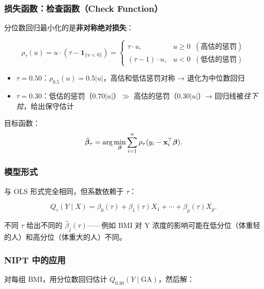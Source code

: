\subsubsection{损失函数：检查函数（Check Function）}

分位数回归最小化的是\textbf{非对称绝对损失}：

\begin{equation}
    \rho_\tau(u) = u \cdot (\tau - \mathbf{1}_{\{u < 0\}})
    = \begin{cases}
        \tau \cdot u,      & u \ge 0 \;\;(\text{高估的惩罚}) \\
        (\tau - 1) \cdot u, & u < 0 \;\;(\text{低估的惩罚})
    \end{cases}
\end{equation}

\begin{itemize}
    \item $\tau = 0.50$：$\rho_{0.5}(u) = 0.5|u|$，高估和低估惩罚对称 → 退化为中位数回归
    \item $\tau = 0.30$：低估的惩罚（$0.70|u|$）$\gg$ 高估的惩罚（$0.30|u|$）→ 回归线被\emph{往下拉}，给出保守估计
\end{itemize}

目标函数：
\begin{equation}
    \hat{\bm{\beta}}_\tau = \arg\min_{\bm{\beta}} \sum_{i=1}^{n} \rho_\tau(y_i - \mathbf{x}_i^\top \bm{\beta}).
\end{equation}

\subsubsection{模型形式}

与 OLS 形式完全相同，但系数依赖于 $\tau$：

\begin{equation}
    Q_\tau(Y \mid X) = \beta_0(\tau) + \beta_1(\tau) X_1 + \cdots + \beta_p(\tau) X_p.
\end{equation}

不同 $\tau$ 给出不同的 $\hat{\beta}_j(\tau)$——例如 BMI 对 Y 浓度的影响可能在低分位（体重轻的人）和高分位（体重大的人）不同。

\subsubsection{NIPT 中的应用}

对每组 BMI，用分位数回归估计 $Q_{0.30}(Y \mid \mathrm{GA})$，然后解：

